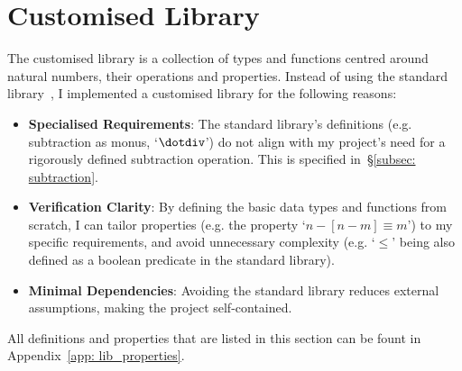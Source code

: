 \documentclass[12pt,a4paper]{report}
\theoremstyle{definition}
\newcommand{\secref}[1]{\S\ref{#1}}
\begin{document}
    \section{Customised Library} \label{sec: lib}
    The customised library is a collection of types and functions centred around natural numbers, their operations and properties. Instead of using the standard library~\autocite{agda_std}, I implemented a customised library for the following reasons:
    \begin{itemize}
        \item
            \textbf{Specialised Requirements}: The standard library's definitions (e.g. subtraction as monus, `$\dotdiv$') do not align with my project's need for a rigorously defined subtraction operation. This is specified in~\secref{subsec: subtraction}.
        \item
            \textbf{Verification Clarity}: By defining the basic data types and functions from scratch, I can tailor properties (e.g. the property `$n-[n-m] \equiv m$') to my specific requirements, and avoid unnecessary complexity (e.g. `$\leq$' being also defined as a boolean predicate in the standard library). 
        \item
            \textbf{Minimal Dependencies}: Avoiding the standard library reduces external assumptions, making the project self-contained. 
    \end{itemize}
    All definitions and properties that are listed in this section can be fount in Appendix~\ref{app: lib_properties}.
\end{document}
